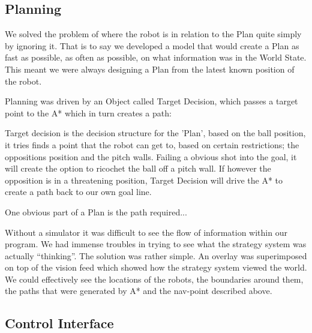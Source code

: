 \subsection{Planning}



We solved the problem of where the robot is in relation to the Plan quite simply
by ignoring it. That is to say we developed a model that would create a Plan
as fast as possible, as often as possible, on what information was in the World
State. This meant we were always designing a Plan from the latest known position 
of the robot.

Planning was driven by an Object called Target Decision, which passes a target
point to the A* which in turn creates a path:


Target decision is the decision structure for the 'Plan', based on the ball 
position, it tries finds a point that the robot can get to, based on certain 
restrictions; the oppositions position and the pitch walls. Failing a obvious
shot into the goal, it will create the option to ricochet the ball off a pitch
wall. If however the opposition is in a threatening position, Target Decision
will drive the A* to create a path back to our own goal line.


One obvious part of a Plan is the path required...

Without a simulator it was difficult to see the flow of information within our program. We had immense troubles in trying to see what the strategy system was actually “thinking”. The solution was rather simple. An overlay was superimposed on top of the vision feed which showed how the strategy system viewed the world. We could effectively see the locations of the robots, the boundaries around them, the paths that were generated by A* and the nav-point described above. 


\subsection{Control Interface}

